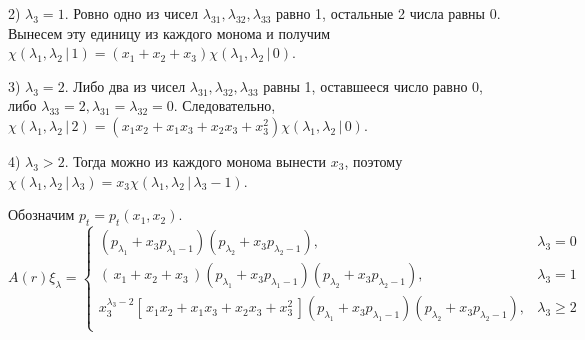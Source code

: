 2) $ \lambda_3 = 1 $. Ровно одно из чисел $ \lambda_{31}, \lambda_{32}, \lambda_{33} $ равно 1, остальные 2 числа равны 0.
Вынесем эту единицу из каждого монома и получим $ \chi (\lambda_1, \lambda_2 \,|\, 1) = (x_1 + x_2 + x_3) \chi (\lambda_1, \lambda_2 \,|\, 0) $.

3) $ \lambda_3 = 2 $. Либо два из чисел $ \lambda_{31}, \lambda_{32}, \lambda_{33} $ равны 1, оставшееся число равно 0, 
либо $ \lambda_{33} = 2, \lambda_{31} = \lambda_{32} = 0 $. Следовательно, 
$ \chi (\lambda_1, \lambda_2 \,|\, 2) = (x_1 x_2 + x_1 x_3 + x_2 x_3 + x_3^2) \chi (\lambda_1, \lambda_2 \,|\, 0) $.

4) $ \lambda_3 > 2 $. Тогда можно из каждого монома вынести $ x_3 $, поэтому
$ \chi (\lambda_1, \lambda_2 \,|\, \lambda_3) = x_3 \chi (\lambda_1, \lambda_2 \,|\, \lambda_3 - 1) $.

Обозначим $ p_t = p_t (x_1, x_2) $.
$$
A(r)\xi_{\lambda} = \left\{ \begin{array}{rl}
(p_{\lambda_1} + x_3 p_{\lambda_1 - 1}) (p_{\lambda_2} + x_3 p_{\lambda_2 - 1}), & \lambda_3 = 0 \\
(\,x_1 + x_2 + x_3 \,)(p_{\lambda_1} + x_3 p_{\lambda_1 - 1}) (p_{\lambda_2} + x_3 p_{\lambda_2 - 1}), & \lambda_3 = 1 \\
x_3^{\lambda_3 - 2}[\,x_1 x_2 + x_1 x_3 + x_2 x_3 + x_3^2 \,](p_{\lambda_1} + x_3 p_{\lambda_1 - 1}) (p_{\lambda_2} + x_3 p_{\lambda_2 - 1}), & \lambda_3 \geqslant 2 \\
\end{array} \right.
$$
